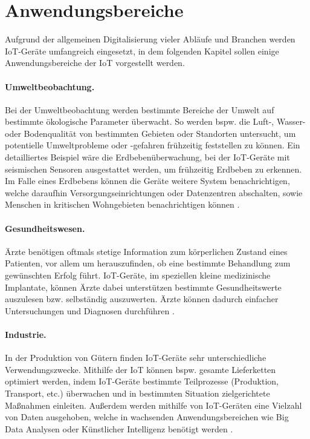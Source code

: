 \section{Anwendungsbereiche}
Aufgrund der allgemeinen Digitalisierung vieler Abläufe und Branchen werden
IoT-Geräte umfangreich eingesetzt, in dem folgenden Kapitel sollen einige
Anwendungsbereiche der IoT vorgestellt werden. 

\paragraph{Umweltbeobachtung.}
Bei der Umweltbeobachtung werden bestimmte Bereiche der Umwelt auf bestimmte
ökologische Parameter überwacht.  So werden bspw. die Luft-, Wasser- oder
Bodenqualität von bestimmten Gebieten oder Standorten untersucht, um potentielle
Umweltprobleme oder -gefahren frühzeitig feststellen zu können.  Ein
detailliertes Beispiel wäre die Erdbebenüberwachung, bei der IoT-Geräte mit
seismischen Sensoren ausgestattet werden, um frühzeitig Erdbeben zu erkennen. Im
Falle eines Erdbebens können die Geräte weitere System benachrichtigen, welche
daraufhin Versorgungseinrichtungen oder  Datenzentren abschalten, sowie Menschen
in kritischen Wohngebieten benachrichtigen können \cite{paper}.

\paragraph{Gesundheitswesen.}
Ärzte benötigen oftmals stetige Information zum kör\-per\-lich\-en Zustand eines
Patienten, vor allem um herauszufinden, ob eine bestimmte Behandlung zum
gewünschten Erfolg führt. IoT-Geräte, im speziellen kleine medizinische
Implantate, können Ärzte dabei unterstützen bestimmte Gesundheitswerte
auszulesen bzw.  selbständig auszuwerten. Ärzte können dadurch einfacher
Untersuchungen und Diagnosen durchführen \cite{paper}.

\paragraph{Industrie.}
In der Produktion von Gütern finden IoT-Geräte sehr unterschiedliche
Verwendungszwecke. Mithilfe der IoT können bspw. gesamte Lieferketten optimiert
werden, indem IoT-Geräte bestimmte Teilprozesse (Produktion, Transport, etc.)
überwachen und in bestimmten Situation zielgerichtete Maßnahmen einleiten.
Außerdem werden mithilfe von IoT-Geräten eine Vielzahl von Daten ausgehoben,
welche in wachsenden Anwendungsbereichen wie Big Data Analysen oder Künstlicher
Intelligenz benötigt werden \cite{paper}.

